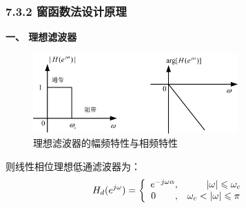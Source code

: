 \documentclass[notheorems,compress,mathserif,table]{beamer}
\begin{document}
\begin{frame}[shrink]\frametitle{7.3.2 窗函数法设计原理}%

  \textbf{一、 理想滤波器}
  \par
       \begin{figure}[h]
           \centering
           \includegraphics[width=0.7\textwidth]{fig2lxlbqtx.jpg}
           \caption{理想滤波器的幅频特性与相频特性}
       \end{figure}
      则线性相位理想低通滤波器为：
      $$
        H_d(e^{j\omega}) =
        \left\{\begin{array}
             {r@{,\quad}l}
             e^{-j\omega\alpha} & \quad\quad|\omega|\leqslant \omega_c\quad\quad\\
             0 \quad\quad       & \omega_c<|\omega|\leqslant \pi
        \end{array} \right.
      $$
\end{frame}
\end{document}
